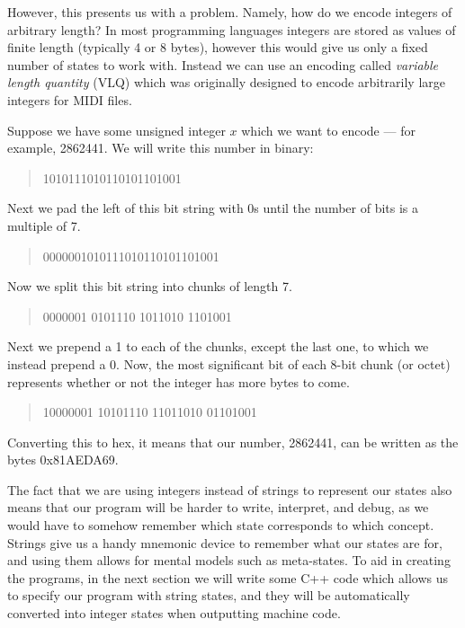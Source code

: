 However, this presents us with a problem. Namely, how do we encode integers of arbitrary length? In most programming languages integers are stored as values of finite length (typically 4 or 8 bytes), however this would give us only a fixed number of states to work with. Instead we can use an encoding called \textit{variable length quantity} (VLQ) which was originally designed to encode arbitrarily large integers for MIDI files.

Suppose we have some unsigned integer $x$ which we want to encode --- for example, 2862441. We will write this number in binary:

\begin{quote}
    1010111010110101101001
\end{quote}

Next we pad the left of this bit string with 0s until the number of bits is a multiple of 7.

\begin{quote}
    0000001010111010110101101001
\end{quote}

Now we split this bit string into chunks of length 7.

\begin{quote}
    0000001 0101110 1011010 1101001
\end{quote}

Next we prepend a 1 to each of the chunks, except the last one, to which we instead prepend a 0. Now, the most significant bit of each 8-bit chunk (or octet) represents whether or not the integer has more bytes to come.

\begin{quote}
    10000001 10101110 11011010 01101001
\end{quote}

Converting this to hex, it means that our number, 2862441, can be written as the bytes 0x81AEDA69.

The fact that we are using integers instead of strings to represent our states also means that our program will be harder to write, interpret, and debug, as we would have to somehow remember which state corresponds to which concept. Strings give us a handy mnemonic device to remember what our states are for, and using them allows for mental models such as meta-states. To aid in creating the programs, in the next section we will write some C++ code which allows us to specify our program with string states, and they will be automatically converted into integer states when outputting machine code.

